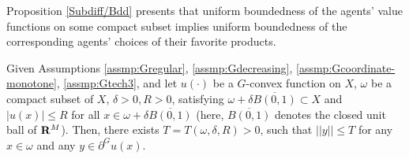 Proposition \ref{Subdiff/Bdd} presents that uniform boundedness of the agents' value functions on some compact subset implies uniform boundedness of the corresponding agents' choices of their favorite products.\medskip

\begin{proposition}\label{Subdiff/Bdd}
	Given Assumptions \ref{assmp:Gregular}, \ref{assmp:Gdecreasing}, \ref{assmp:Gcoordinate-monotone}, \ref{assmp:Gtech3}, and let $u(\cdot)$ be a $G$-convex function on $X$, $\omega$ be a compact subset of $X$, $\delta>0, R>0$, satisfying $\omega+\delta\overline{B(0,1)}\subset X$ and $|u(x)|\le R$ for all $x\in \omega + \delta \overline{B(0,1)}$ (here, $\overline{B(0,1)}$ denotes the closed unit ball of ${\mathbf R}^M$). Then, there exists $T = T(\omega,\delta, R) > 0$, such that $||y||\le T$ for any $x \in \omega$ and any $y\in \partial^Gu(x)$.
\end{proposition}

